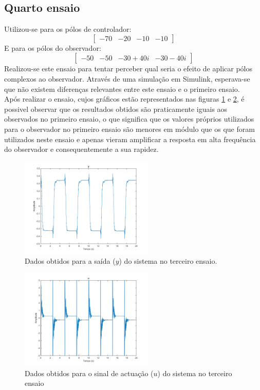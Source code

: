 \documentclass[%
  reprint,
  nofootinbib,
  amsmath,amssymb,
  aps,
  10pt,
  a4paper
]{revtex4-1}
\begin{document}
\subsection{Quarto ensaio}
Utilizou-se para os pólos de controlador:
\begin{equation}
\begin{bmatrix}
-70 & -20 & -10 &-10
\end{bmatrix}
\end{equation}
E para os pólos do observador:
\begin{equation}
\begin{bmatrix}
-50 & -50 & -30+40i &-30-40i
\end{bmatrix}
\end{equation}
Realizou-se este ensaio para tentar perceber qual seria o efeito de aplicar pólos complexos ao observador. Através de uma simulação em Simulink, esperava-se que não existem diferenças relevantes entre este ensaio e o primeiro ensaio.\\
Após realizar o ensaio, cujos gráficos estão representados nas figuras \ref{fig:y_f} e \ref{fig:u_f}, é possivel observar que os resultados obtidos são praticamente iguais aos observados no primeiro ensaio, o que significa que os valores próprios utilizados para o observador no primeiro ensaio são menores em módulo que os que foram utilizados neste ensaio e apenas vieram amplificar a resposta em alta frequência do observador e consequentemente a sua rapidez.
\begin{figure}
\includegraphics[width=2.5in]{../imgs/dados_00_f/dados_00_f_y.png}
\caption{Dados obtidos para a saída ($y$) do sistema no terceiro ensaio.}
\label{fig:y_f}
\end{figure}
\begin{figure}
\includegraphics[width=2.5in]{../imgs/dados_00_f/dados_00_f_u.png}
\caption{Dados obtidos para o sinal de actuação ($u$) do sistema no terceiro ensaio}
\label{fig:u_f}
\end{figure}
\end{document}
